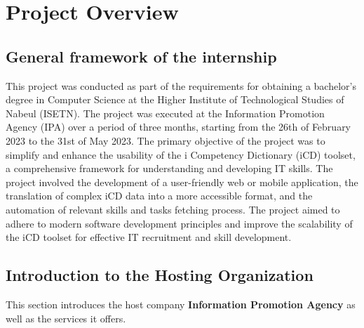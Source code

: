 \chapter{Project Overview}
\minitoc
\newpage


\setcounter{secnumdepth}{2} %
\section{General framework of the internship}
This project was conducted as part of the requirements for obtaining a bachelor’s degree in Computer Science at the Higher Institute of Technological Studies of Nabeul (ISETN). The project was executed at the Information Promotion Agency (IPA) over a period of three months, starting from the 26th of February 2023 to the 31st of May 2023. The primary objective of the project was to simplify and enhance the usability of the i Competency Dictionary (iCD) toolset, a comprehensive framework for understanding and developing IT skills. The project involved the development of a user-friendly web or mobile application, the translation of complex iCD data into a more accessible format, and the automation of relevant skills and tasks fetching process. The project aimed to adhere to modern software development principles and improve the scalability of the iCD toolset for effective IT recruitment and skill development.


\section{Introduction to the Hosting Organization}
This section introduces the host company {\bf Information Promotion Agency} as well as the services it offers.

